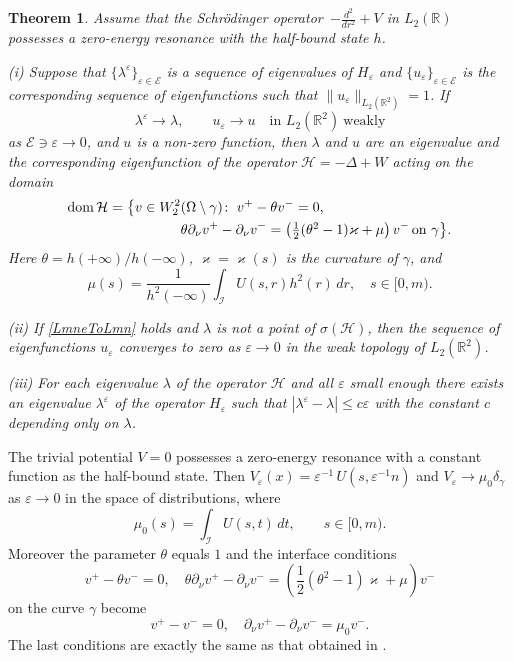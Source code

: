 \documentclass[reqno]{amsart}
\theoremstyle{plain}
\newtheorem{thm}{Theorem}
\numberwithin{equation}{section}
\newcommand{\dom}{\mathop{\rm dom}}
\renewcommand{\kappa}{\varkappa}
\newcommand{\Real}{\mathbb R}
\newcommand{\eps}{\varepsilon}
\newcommand{\cI}{\mathcal{I}}
\newcommand{\cE}{\mathcal{E}}
\newcommand{\lme}{\lambda^\eps}
\newcommand{\cH}{\mathcal{H}}
\renewcommand{\leq}{\leqslant}
\begin{document}
\begin{thm}\label{MainThrmRes}
Assume that the Schr\"odinger operator~$-\frac{d^2}{d r^2}+V$ in $L_2(\Real)$ possesses a zero-energy resonance with the half-bound state $h$.

(i) Suppose that $\{\lme\}_{\eps\in\cE}$ is a sequence of eigenvalues of $H_\eps$ and $\{u_\eps\}_{\eps\in\cE}$ is the corresponding sequence of  eigenfunctions such that $\|u_\eps\|_{L_2(\Real^2)}=1$. If
\begin{equation}\label{LmneToLmn}
  \lme \to \lambda, \qquad u_\eps \to u\quad \text{in } L_2(\Real^2) \   \text{weakly}
\end{equation}
as $\cE\ni\eps\to 0$,  and $u$ is a non-zero function, then $\lambda$ and $u$ are an eigenvalue and the corresponding eigenfunction of the operator $\cH=-\Delta +W$ acting on the domain
\begin{align*}
  \dom \cH=\big\{v\in W_2^2&(\Omega\setminus\gamma)\colon\;v^+-\theta v^-=0,\\  &\theta\partial_\nu v^+-\partial_\nu v^-
=\left(\textstyle\frac{1}{2 }(\theta^2-1)\kappa+\mu\right) v^-\,\text{on } \gamma \big\}.
\end{align*}
Here $\theta=h(+\infty)/h(-\infty)$, $\kappa=\kappa(s)$ is the  curvature of $\gamma$, and
\begin{equation}\label{Mu}
  \mu(s)=\frac{1}{h^2(-\infty)} \int_{\cI} U(s,r)h^2(r)\, dr,\quad s\in [0,m).
\end{equation}

(ii) If \eqref{LmneToLmn} holds and $\lambda$ is not a point of  $\sigma(\cH)$, then the sequence of eigenfunctions $u_\eps$ converges to zero as $\eps\to 0$ in the weak topology of  $L_2(\Real^2)$.

(iii) For each eigenvalue $\lambda$ of the operator $\cH$ and  all $\eps$ small enough there exists an eigenvalue $\lme$ of the operator $H_\eps$ such that
$|\lme-\lambda|\leq c\eps$
with the constant $c$ depending only on $\lambda$.
\end{thm}

The trivial potential $V=0$ possesses a zero-energy resonance with a constant function as  the half-bound state. Then $V_\eps(x) =\eps^{-1}\,U\left(s,\eps^{-1}n\right)$ and
$V_\eps\to \mu_0 \delta_\gamma$ as $\eps\to 0$ in the space of distributions, where
\begin{equation}\label{Mu0}
  \mu_0(s)=\int_{\cI}U(s,t)\, dt,\qquad s\in [0,m).
\end{equation}
Moreover the parameter $\theta$ equals  $1$ and the interface conditions
\begin{equation}\label{ConnectedCond}
  v^+-\theta v^-=0,\quad \theta\partial_\nu v^+-\partial_\nu v^-
=\left(\textstyle\frac{1}{2 }(\theta^2-1)\kappa+\mu\right) v^-
\end{equation}
on the curve  $\gamma$ become
\begin{equation*}
  v^+- v^-=0, \quad \partial_\nu v^+-\partial_\nu v^-
=\mu_0 v^-.
\end{equation*}
The last conditions are exactly the same as that obtained in \cite{BehrndtExnerHolzmannLotoreichik2017}.
\end{document}
